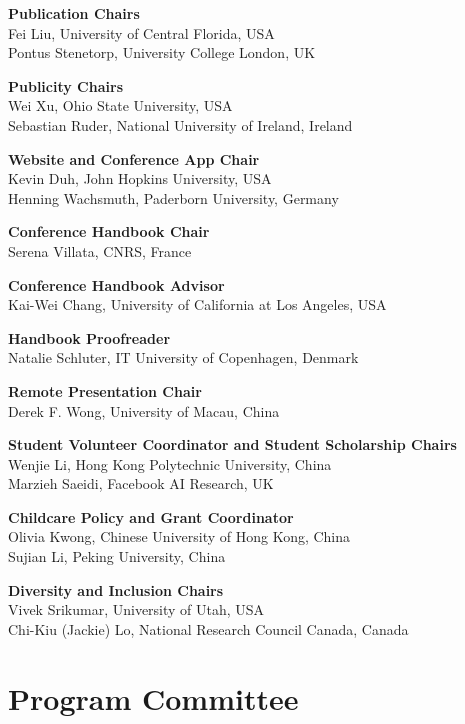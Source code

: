 {\bf Publication Chairs} \\
Fei Liu, University of Central Florida, USA \\
Pontus Stenetorp, University College London, UK


{\bf Publicity Chairs}\\
Wei Xu, Ohio State University, USA \\
Sebastian Ruder, National University of Ireland, Ireland


{\bf Website and Conference App Chair}\\
Kevin Duh, John Hopkins University, USA \\
Henning Wachsmuth, Paderborn University, Germany


{\bf Conference Handbook Chair}\\
Serena Villata, CNRS, France


{\bf Conference Handbook Advisor}\\
Kai-Wei Chang, University of California at Los Angeles, USA


{\bf Handbook Proofreader}\\
Natalie Schluter, IT University of Copenhagen, Denmark


{\bf Remote Presentation Chair}\\
Derek F. Wong, University of Macau, China


{\bf Student Volunteer Coordinator and Student Scholarship Chairs}\\
Wenjie Li, Hong Kong Polytechnic University, China \\
Marzieh Saeidi, Facebook AI Research, UK  


{\bf Childcare Policy and Grant Coordinator}\\
Olivia Kwong, Chinese University of Hong Kong, China \\
Sujian Li, Peking University, China


{\bf Diversity and Inclusion Chairs}\\
Vivek Srikumar, University of Utah, USA \\
Chi-Kiu (Jackie) Lo, National Research Council Canada, Canada


\clearpage
\section{Program Committee}
\setlength{\parindent}{0pt}

\vspace*{0.5cm}

